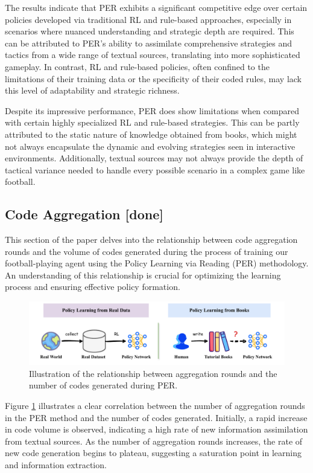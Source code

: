 The results indicate that PER exhibits a significant competitive edge over certain policies developed via traditional RL and rule-based approaches, especially in scenarios where nuanced understanding and strategic depth are required. This can be attributed to PER's ability to assimilate comprehensive strategies and tactics from a wide range of textual sources, translating into more sophisticated gameplay. In contrast, RL and rule-based policies, often confined to the limitations of their training data or the specificity of their coded rules, may lack this level of adaptability and strategic richness.


Despite its impressive performance, PER does show limitations when compared with certain highly specialized RL and rule-based strategies. This can be partly attributed to the static nature of knowledge obtained from books, which might not always encapsulate the dynamic and evolving strategies seen in interactive environments. Additionally, textual sources may not always provide the depth of tactical variance needed to handle every possible scenario in a complex game like football.

\subsection{Code Aggregation [done]}

This section of the paper delves into the relationship between code aggregation rounds and the volume of codes generated during the process of training our football-playing agent using the Policy Learning via Reading (PER) methodology. An understanding of this relationship is crucial for optimizing the learning process and ensuring effective policy formation.

\begin{figure}[ht]
\centering
\includegraphics[width=0.75\linewidth]{fig/PER-problem.pdf}
\caption{Illustration of the relationship between aggregation rounds and the number of codes generated during PER.}
\label{fig:code_aggregation}
\end{figure}


Figure \ref{fig:code_aggregation} illustrates a clear correlation between the number of aggregation rounds in the PER method and the number of codes generated. Initially, a rapid increase in code volume is observed, indicating a high rate of new information assimilation from textual sources. As the number of aggregation rounds increases, the rate of new code generation begins to plateau, suggesting a saturation point in learning and information extraction.


